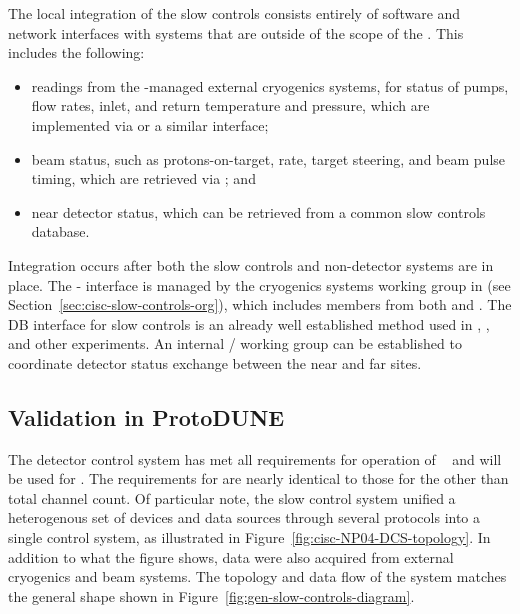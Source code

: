 The local integration of the slow controls consists entirely of software
and network interfaces with systems that are outside of the scope of the . 
This includes the following:
\begin{itemize}
\item readings from the -managed external cryogenics systems, for status of pumps, flow rates, inlet, and return temperature and pressure, which are implemented via  or a similar  interface; 
\item beam status, such as protons-on-target, rate, target steering, and beam pulse timing, which are retrieved via ; 
and \item near detector status, which can be retrieved from a common slow controls database.
\end{itemize}
%
Integration occurs after both the slow controls and non-detector
systems are in place.  The - interface is managed by the
cryogenics systems working group in  (see Section~\ref{sec:cisc-slow-controls-org}), which includes members from both  and . 
The  DB interface for slow controls is an already well established method used in , , and other  experiments. An internal / working group can be established 
to coordinate detector status exchange between the near and far sites.

\subsection{Validation in ProtoDUNE}
\label{sec:cisc-slow-control-pdsp}

The  detector control system has met
all requirements for operation of ~\cite{pdspdcs_proc} and will be used for . The requirements for  are
nearly identical to those for the  other than
total channel count. Of particular note, the  slow control system unified a heterogenous set of devices and data sources
through several protocols into a
single control system, as illustrated in
Figure~\ref{fig:cisc-NP04-DCS-topology}. In addition to what
the figure shows, data were also acquired from external cryogenics and beam
systems.  The topology and data flow of the system matches the general
shape shown in Figure~\ref{fig:gen-slow-controls-diagram}.

